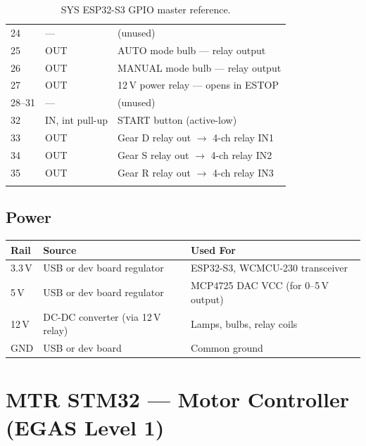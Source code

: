 \documentclass[12pt,a4paper,oneside]{report}
\begin{document}
\begin{center}
\begin{longtable}{lll}
24 & ---              & (unused) \\
25 & OUT              & AUTO mode bulb --- relay output \\
26 & OUT              & MANUAL mode bulb --- relay output \\
27 & OUT              & 12\,V power relay --- opens in ESTOP \\
28--31 & ---          & (unused) \\
32 & IN, int pull-up  & START button (active-low) \\
33 & OUT              & Gear D relay out $\rightarrow$ 4-ch relay IN1 \\
34 & OUT              & Gear S relay out $\rightarrow$ 4-ch relay IN2 \\
35 & OUT              & Gear R relay out $\rightarrow$ 4-ch relay IN3 \\
\bottomrule
\caption{SYS ESP32-S3 GPIO master reference.}
\end{longtable}
\end{center}

\section{Power}

\begin{center}
\begin{tabular}{lll}
\toprule
\textbf{Rail} & \textbf{Source} & \textbf{Used For} \\
\midrule
3.3\,V & USB or dev board regulator & ESP32-S3, WCMCU-230 transceiver \\
5\,V   & USB or dev board regulator & MCP4725 DAC VCC (for 0--5\,V output) \\
12\,V  & DC-DC converter (via 12\,V relay) & Lamps, bulbs, relay coils \\
GND    & USB or dev board & Common ground \\
\bottomrule
\end{tabular}
\end{center}


\chapter{MTR STM32 --- Motor Controller (EGAS Level 1)}
\end{document}
